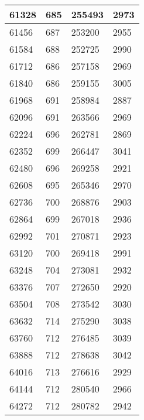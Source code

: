 \begin{longtable}{|l|l|l|l|}
		61328 & 685         & 255493          & 2973             \\ \hline
		61456 & 687         & 253200          & 2955             \\ \hline
		61584 & 688         & 252725          & 2990             \\ \hline
		61712 & 686         & 257158          & 2969             \\ \hline
		61840 & 686         & 259155          & 3005             \\ \hline
		61968 & 691         & 258984          & 2887             \\ \hline
		62096 & 691         & 263566          & 2969             \\ \hline
		62224 & 696         & 262781          & 2869             \\ \hline
		62352 & 699         & 266447          & 3041             \\ \hline
		62480 & 696         & 269258          & 2921             \\ \hline
		62608 & 695         & 265346          & 2970             \\ \hline
		62736 & 700         & 268876          & 2903             \\ \hline
		62864 & 699         & 267018          & 2936             \\ \hline
		62992 & 701         & 270871          & 2923             \\ \hline
		63120 & 700         & 269418          & 2991             \\ \hline
		63248 & 704         & 273081          & 2932             \\ \hline
		63376 & 707         & 272650          & 2920             \\ \hline
		63504 & 708         & 273542          & 3030             \\ \hline
		63632 & 714         & 275290          & 3038             \\ \hline
		63760 & 712         & 276485          & 3039             \\ \hline
		63888 & 712         & 278638          & 3042             \\ \hline
		64016 & 713         & 276616          & 2929             \\ \hline
		64144 & 712         & 280540          & 2966             \\ \hline
		64272 & 712         & 280782          & 2942             \\ \hline

\end{longtable}
